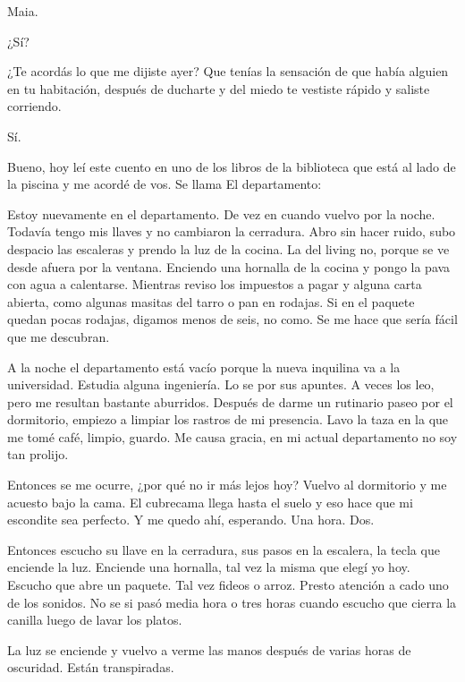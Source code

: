 \documentclass[11pt,twoside,openright,a6paper]{book}
\begin{document}
Maia.

¿Sí?

¿Te acordás lo que me dijiste ayer? Que tenías la sensación de que había
alguien en tu habitación, después de ducharte y del miedo te vestiste
rápido y saliste corriendo.

Sí.

Bueno, hoy leí este cuento en uno de los libros de la biblioteca que está
al lado de la piscina y me acordé de vos. Se llama El departamento:

Estoy nuevamente en el departamento. De vez en cuando vuelvo por la
noche. Todavía tengo mis llaves y no cambiaron la cerradura. Abro sin hacer
ruido, subo despacio las escaleras y prendo la luz de la cocina. La del
living no, porque se ve desde afuera por la ventana. Enciendo una hornalla
de la cocina y pongo la pava con agua a calentarse. Mientras reviso los
impuestos a pagar y alguna carta abierta, como algunas masitas del tarro
o pan en rodajas. Si en el paquete quedan pocas rodajas, digamos menos de
seis, no como. Se me hace que sería fácil que me descubran.

A la noche el departamento está vacío porque la nueva inquilina va a la
universidad. Estudia alguna ingeniería. Lo se por sus apuntes. A veces los
leo, pero me resultan bastante aburridos. Después de darme un rutinario
paseo por el dormitorio, empiezo a limpiar los rastros de mi presencia. Lavo
la taza en la que me tomé café, limpio, guardo. Me causa gracia, en mi
actual departamento no soy tan prolijo.

Entonces se me ocurre, ¿por qué no ir más lejos hoy? Vuelvo al dormitorio
y me acuesto bajo la cama. El cubrecama llega hasta el suelo y eso hace
que mi escondite sea perfecto. Y me quedo ahí, esperando. Una hora. Dos.

Entonces escucho su llave en la cerradura, sus pasos en la escalera, la tecla
que enciende la luz. Enciende una hornalla, tal vez la misma que elegí yo
hoy. Escucho que abre un paquete. Tal vez fideos o arroz. Presto atención
a cado uno de los sonidos. No se si pasó media hora o tres horas cuando
escucho que cierra la canilla luego de lavar los platos.

La luz se enciende y vuelvo a verme las manos después de varias horas de
oscuridad. Están transpiradas.


\vspace{0.5cm}
\hrulefill\hspace{0.2cm} \decofourleft\decofourright \hspace{0.2cm} \hrulefill
\vspace{0.5cm}
\end{document}
